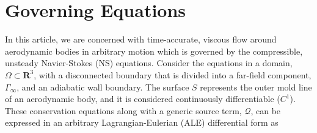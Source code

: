 
\section{Governing Equations}
\label{sec:govEq}

In this article, we are concerned with time-accurate, viscous flow around aerodynamic bodies in arbitrary motion which is governed by the compressible, unsteady Navier-Stokes (NS) equations. Consider the equations in a domain, $\Omega \subset \mathbf{R}^3$, with a disconnected boundary that is divided into a far-field component, $\Gamma_\infty$, and an adiabatic wall boundary. The surface $S$ represents the outer mold line of an aerodynamic body, and it is considered continuously differentiable ($C^1$). These conservation equations along with a generic source term, $\mathcal{Q} $, can be expressed in an arbitrary Lagrangian-Eulerian (ALE) differential form as

